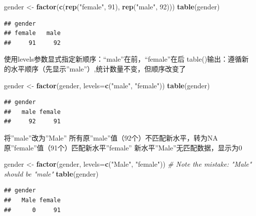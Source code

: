 \documentclass[
]{article}
\newenvironment{Shaded}{\begin{snugshade}}{\end{snugshade}}
\newcommand{\AttributeTok}[1]{\textcolor[rgb]{0.13,0.29,0.53}{#1}}
\newcommand{\CommentTok}[1]{\textcolor[rgb]{0.56,0.35,0.01}{\textit{#1}}}
\newcommand{\DecValTok}[1]{\textcolor[rgb]{0.00,0.00,0.81}{#1}}
\newcommand{\FunctionTok}[1]{\textcolor[rgb]{0.13,0.29,0.53}{\textbf{#1}}}
\newcommand{\NormalTok}[1]{#1}
\newcommand{\OtherTok}[1]{\textcolor[rgb]{0.56,0.35,0.01}{#1}}
\newcommand{\StringTok}[1]{\textcolor[rgb]{0.31,0.60,0.02}{#1}}
\begin{document}
\begin{Shaded}
\begin{Highlighting}[]
\NormalTok{gender }\OtherTok{\textless{}{-}} \FunctionTok{factor}\NormalTok{(}\FunctionTok{c}\NormalTok{(}\FunctionTok{rep}\NormalTok{(}\StringTok{"female"}\NormalTok{, }\DecValTok{91}\NormalTok{), }\FunctionTok{rep}\NormalTok{(}\StringTok{"male"}\NormalTok{, }\DecValTok{92}\NormalTok{)))}
\FunctionTok{table}\NormalTok{(gender)}
\end{Highlighting}
\end{Shaded}

\begin{verbatim}
## gender
## female   male 
##     91     92
\end{verbatim}

使用levels参数显式指定新顺序：``male''在前，``female''在后
table()输出：遵循新的水平顺序（先显示''male''）,统计数量不变，但顺序改变了

\begin{Shaded}
\begin{Highlighting}[]
\NormalTok{gender }\OtherTok{\textless{}{-}} \FunctionTok{factor}\NormalTok{(gender, }\AttributeTok{levels=}\FunctionTok{c}\NormalTok{(}\StringTok{"male"}\NormalTok{, }\StringTok{"female"}\NormalTok{))}
\FunctionTok{table}\NormalTok{(gender)}
\end{Highlighting}
\end{Shaded}

\begin{verbatim}
## gender
##   male female 
##     92     91
\end{verbatim}

将''male''改为''Male'' 所有原''male''值（92个）不匹配新水平，转为NA
原''female''值（91个）匹配新水平''female''
新水平''Male''无匹配数据，显示为0

\begin{Shaded}
\begin{Highlighting}[]
\NormalTok{gender }\OtherTok{\textless{}{-}} \FunctionTok{factor}\NormalTok{(gender, }\AttributeTok{levels=}\FunctionTok{c}\NormalTok{(}\StringTok{"Male"}\NormalTok{, }\StringTok{"female"}\NormalTok{))}
\CommentTok{\# Note the mistake: "Male" should be "male"}
\FunctionTok{table}\NormalTok{(gender)}
\end{Highlighting}
\end{Shaded}

\begin{verbatim}
## gender
##   Male female 
##      0     91
\end{verbatim}
\end{document}
